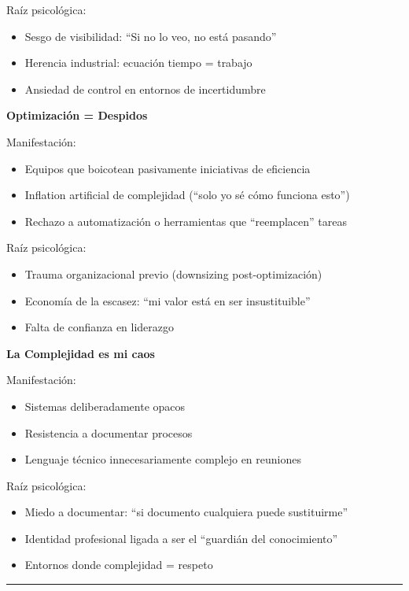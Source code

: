 Raíz psicológica:
\begin{itemize}
    \item Sesgo de visibilidad: ``Si no lo veo, no está pasando''
    \item Herencia industrial: ecuación tiempo = trabajo
    \item Ansiedad de control en entornos de incertidumbre
\end{itemize}

\textbf{Optimización = Despidos}

Manifestación:
\begin{itemize}
    \item Equipos que boicotean pasivamente iniciativas de eficiencia
    \item Inflation artificial de complejidad (``solo yo sé cómo funciona esto'')
    \item Rechazo a automatización o herramientas que ``reemplacen'' tareas
\end{itemize}

Raíz psicológica:
\begin{itemize}
    \item Trauma organizacional previo (downsizing post-optimización)
    \item Economía de la escasez: ``mi valor está en ser insustituible''
    \item Falta de confianza en liderazgo
\end{itemize}

\textbf{La Complejidad es mi caos}

Manifestación:
\begin{itemize}
    \item Sistemas deliberadamente opacos
    \item Resistencia a documentar procesos
    \item Lenguaje técnico innecesariamente complejo en reuniones
\end{itemize}

Raíz psicológica:
\begin{itemize}
    \item Miedo a documentar: ``si documento cualquiera puede sustituirme''
    \item Identidad profesional ligada a ser el ``guardián del conocimiento''
    \item Entornos donde complejidad = respeto
\end{itemize}


\hrule

